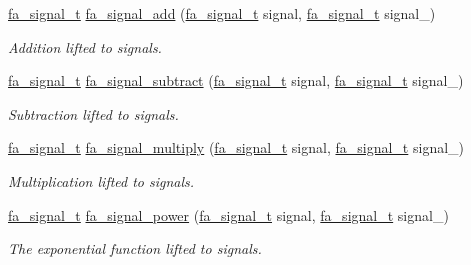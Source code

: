 \begin{DoxyCompactItemize}
\item 
\hyperlink{group___fa_signal_gac5c72f160cd6e93a6783551627b166e5}{fa\-\_\-signal\-\_\-t} \hyperlink{group___fa_signal_ga3c4df1d00a48cecb304e4d26624c9189}{fa\-\_\-signal\-\_\-add} (\hyperlink{group___fa_signal_gac5c72f160cd6e93a6783551627b166e5}{fa\-\_\-signal\-\_\-t} signal, \hyperlink{group___fa_signal_gac5c72f160cd6e93a6783551627b166e5}{fa\-\_\-signal\-\_\-t} signal\-\_\-)
\begin{DoxyCompactList}\small\item\em Addition lifted to signals. \end{DoxyCompactList}\item 
\hyperlink{group___fa_signal_gac5c72f160cd6e93a6783551627b166e5}{fa\-\_\-signal\-\_\-t} \hyperlink{group___fa_signal_ga756384456000b5d0f69895e61f7e2160}{fa\-\_\-signal\-\_\-subtract} (\hyperlink{group___fa_signal_gac5c72f160cd6e93a6783551627b166e5}{fa\-\_\-signal\-\_\-t} signal, \hyperlink{group___fa_signal_gac5c72f160cd6e93a6783551627b166e5}{fa\-\_\-signal\-\_\-t} signal\-\_\-)
\begin{DoxyCompactList}\small\item\em Subtraction lifted to signals. \end{DoxyCompactList}\item 
\hyperlink{group___fa_signal_gac5c72f160cd6e93a6783551627b166e5}{fa\-\_\-signal\-\_\-t} \hyperlink{group___fa_signal_ga953cc9ff46d11a48fd284a1058928ded}{fa\-\_\-signal\-\_\-multiply} (\hyperlink{group___fa_signal_gac5c72f160cd6e93a6783551627b166e5}{fa\-\_\-signal\-\_\-t} signal, \hyperlink{group___fa_signal_gac5c72f160cd6e93a6783551627b166e5}{fa\-\_\-signal\-\_\-t} signal\-\_\-)
\begin{DoxyCompactList}\small\item\em Multiplication lifted to signals. \end{DoxyCompactList}\item 
\hyperlink{group___fa_signal_gac5c72f160cd6e93a6783551627b166e5}{fa\-\_\-signal\-\_\-t} \hyperlink{group___fa_signal_gada3e9fef25d210f11e64681e647b749d}{fa\-\_\-signal\-\_\-power} (\hyperlink{group___fa_signal_gac5c72f160cd6e93a6783551627b166e5}{fa\-\_\-signal\-\_\-t} signal, \hyperlink{group___fa_signal_gac5c72f160cd6e93a6783551627b166e5}{fa\-\_\-signal\-\_\-t} signal\-\_\-)
\begin{DoxyCompactList}\small\item\em The exponential function lifted to signals. \end{DoxyCompactList}\item 

\end{DoxyCompactItemize}
